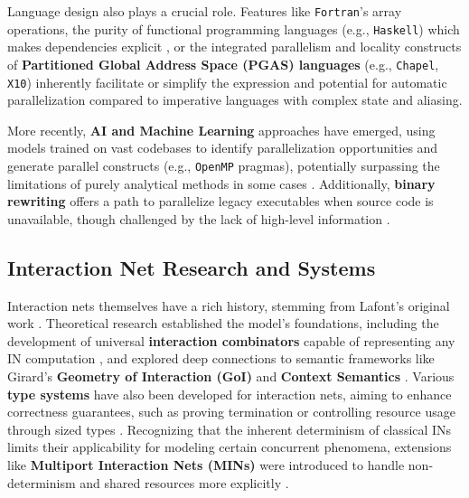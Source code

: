Language design also plays a crucial role. Features like \texttt{Fortran}'s array operations, the purity of functional programming languages (e.g., \texttt{Haskell}) which makes dependencies explicit \cite{Hammond1996ParallelFunctional}, or the integrated parallelism and locality constructs of \textbf{Partitioned Global Address Space (PGAS) languages} (e.g., \texttt{Chapel}, \texttt{X10}) \cite{Yelick2007ProductivityParallel} inherently facilitate or simplify the expression and potential for automatic parallelization compared to imperative languages with complex state and aliasing.

More recently, \textbf{AI and Machine Learning} approaches have emerged, using models trained on vast codebases to identify parallelization opportunities and generate parallel constructs (e.g., \texttt{OpenMP} pragmas), potentially surpassing the limitations of purely analytical methods in some cases \cite{OMPar}. Additionally, \textbf{binary rewriting} offers a path to parallelize legacy executables when source code is unavailable, though challenged by the lack of high-level information \cite{Amaral2006AutomaticBinary}.

\subsection{Interaction Net Research and Systems}
Interaction nets themselves have a rich history, stemming from Lafont's original work \cite{lafont1990interactionnets}. Theoretical research established the model's foundations, including the development of universal \textbf{interaction combinators} capable of representing any IN computation \cite{Lafont1995InteractionCombinators}, and explored deep connections to semantic frameworks like Girard's \textbf{Geometry of Interaction (GoI)} \cite{Girard1989GeometryInteraction} and \textbf{Context Semantics} \cite{Coquand1992ContextSemantics}. Various \textbf{type systems} have also been developed for interaction nets, aiming to enhance correctness guarantees, such as proving termination \cite{Pinto2010TerminationInteraction} or controlling resource usage through sized types \cite{Ghilezan2014SizedTypes}. Recognizing that the inherent determinism of classical INs limits their applicability for modeling certain concurrent phenomena, extensions like \textbf{Multiport Interaction Nets (MINs)} were introduced to handle non-determinism and shared resources more explicitly \cite{Fernandez2006MultiportInteraction}.

